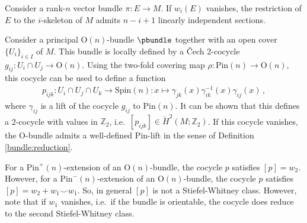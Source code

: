 
    \begin{property}
        Consider a rank-$n$ vector bundle $\pi:E\rightarrow M$. If $w_i(E)$ vanishes, the restriction of $E$ to the $i$-skeleton of $M$ admits $n-i+1$ linearly independent sections.
    \end{property}

    Consider a principal $\mathrm{O}(n)$-bundle $\pbundle$ together with an open cover $\{U_i\}_{i\in I}$ of $M$. This bundle is locally defined by a \v{C}ech 2-cocycle $g_{ij}:U_i\cap U_j\rightarrow\mathrm{O}(n)$. Using the two-fold covering map $\rho:\mathrm{Pin}(n)\rightarrow\mathrm{O}(n)$, this cocycle can be used to define a function
    \begin{gather}
        p_{ijk}:U_i\cap U_j\cap U_k\rightarrow\mathrm{Spin}(n):x\mapsto\gamma_{jk}(x)\gamma^{-1}_{ik}(x)\gamma_{ij}(x)\,,
    \end{gather}
    where $\gamma_{ij}$ is a lift of the cocycle $g_{ij}$ to $\mathrm{Pin}(n)$. It can be shown that this defines a 2-cocycle with values in $\mathbb{Z}_2$, i.e.~$[p_{ijk}]\in\check{H}^2(M;\mathbb{Z}_2)$. If this cocycle vanishes, the $\mathrm{O}$-bundle admits a well-defined $\mathrm{Pin}$-lift in the sense of Definition \ref{bundle:reduction}.

    \begin{property}
        For a $\mathrm{Pin}^+(n)$-extension of an $\mathrm{O}(n)$-bundle, the cocycle $p$ satisfies $[p]=w_2$. However, for a $\mathrm{Pin}^-(n)$-extension of an $\mathrm{O}(n)$-bundle, the cocycle $p$ satisfies $[p]=w_2+w_1\smile w_1$. So, in general $[p]$ is not a Stiefel-Whitney class. However, note that if $w_1$ vanishes, i.e.~if the bundle is orientable, the cocycle does reduce to the second Stiefel-Whitney class.
    \end{property}

